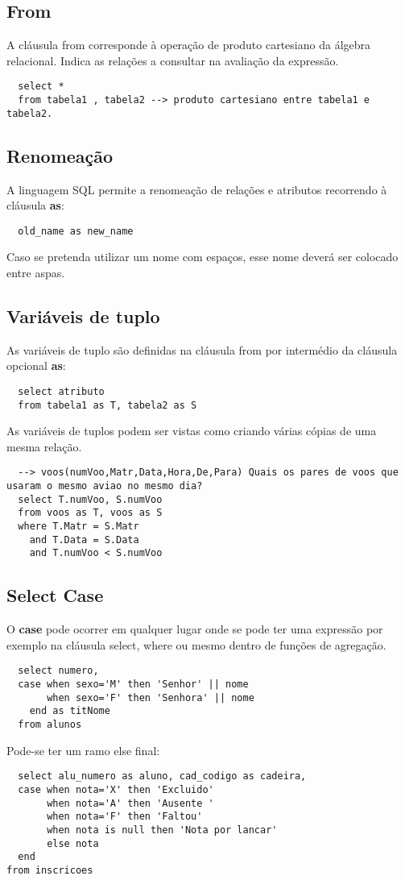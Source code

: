 \documentclass{article}
\begin{document}
\subsection{From}
A cláusula from corresponde à operação de produto cartesiano da álgebra relacional. Indica as relações a consultar na avaliação da expressão.
\begin{lstlisting}
  select *
  from tabela1 , tabela2 --> produto cartesiano entre tabela1 e tabela2.
\end{lstlisting}

\subsection{Renomeação}
A linguagem SQL permite a renomeação de relações e atributos recorrendo à cláusula \textbf{as}:
\begin{lstlisting}
  old_name as new_name
\end{lstlisting}
Caso se pretenda utilizar um nome com espaços, esse nome deverá ser colocado entre aspas.

\subsection{Variáveis de tuplo}
As variáveis de tuplo são definidas na cláusula from por intermédio da cláusula opcional \textbf{as}:
\begin{lstlisting}
  select atributo 
  from tabela1 as T, tabela2 as S
\end{lstlisting}
As variáveis de tuplos podem ser vistas como criando várias cópias de uma mesma relação.
\begin{lstlisting}
  --> voos(numVoo,Matr,Data,Hora,De,Para) Quais os pares de voos que usaram o mesmo aviao no mesmo dia?
  select T.numVoo, S.numVoo
  from voos as T, voos as S
  where T.Matr = S.Matr 
    and T.Data = S.Data
    and T.numVoo < S.numVoo
\end{lstlisting}

\subsection{Select Case}
O \textbf{case} pode ocorrer em qualquer lugar onde se pode ter uma expressão por exemplo na cláusula select, where ou mesmo dentro de funções de agregação.
\begin{lstlisting}
  select numero,
  case when sexo='M' then 'Senhor' || nome
       when sexo='F' then 'Senhora' || nome
    end as titNome
  from alunos
\end{lstlisting}
Pode-se ter um ramo else final:
\begin{lstlisting}
  select alu_numero as aluno, cad_codigo as cadeira,
  case when nota='X' then 'Excluido'
       when nota='A' then 'Ausente '
       when nota='F' then 'Faltou'
       when nota is null then 'Nota por lancar'
       else nota
  end
from inscricoes
\end{lstlisting}
\end{document}
